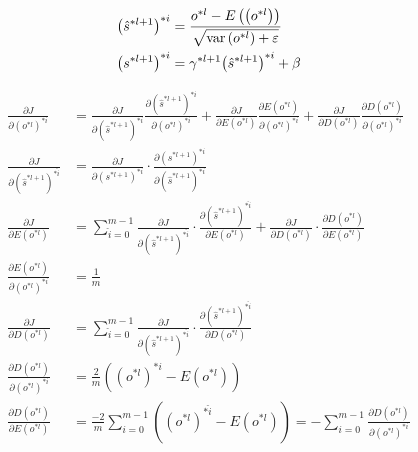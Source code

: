 \documentclass[runningheads,openany]{xhlPaper}
\begin{document}
\begin{equation}
\begin{aligned}
{\left( {{{\hat s}^{*l + 1}}} \right)^{*i}} &= \frac{{{o^{*l}} - E\left( {\left( {{o^{*l}}} \right)} \right)}}{{\sqrt {{\mathop{\rm var}} \left( {{o^{*l}}} \right) + \varepsilon } }}\\
{\left( {{s^{*l + 1}}} \right)^{*i}} &= {\gamma ^{*l + 1}}{\left( {{{\hat s}^{*l + 1}}} \right)^{*i}} + \beta 
\end{aligned}
\end{equation}

\begin{equation}
\begin{aligned}
\frac{{\partial J}}{{\partial {{\left( {{o^{*l}}} \right)}^{*i}}}} &= \frac{{\partial J}}{{\partial {{\left( {{{\hat s}^{*l + 1}}} \right)}^{*i}}}}\frac{{\partial {{\left( {{{\hat s}^{*l + 1}}} \right)}^{*i}}}}{{\partial {{\left( {{o^{*l}}} \right)}^{*i}}}} + \frac{{\partial J}}{{\partial E\left( {{o^{*l}}} \right)}}\frac{{\partial E\left( {{o^{*l}}} \right)}}{{\partial {{\left( {{o^{*l}}} \right)}^{*i}}}} + \frac{{\partial J}}{{\partial D\left( {{o^{*l}}} \right)}}\frac{{\partial D\left( {{o^{*l}}} \right)}}{{\partial {{\left( {{o^{*l}}} \right)}^{*i}}}}\\
\frac{{\partial J}}{{\partial {{\left( {{{\hat s}^{*l + 1}}} \right)}^{*\hat i}}}} &= \frac{{\partial J}}{{\partial {{\left( {{s^{*l + 1}}} \right)}^{*i}}}} \cdot \frac{{\partial {{\left( {{s^{*l + 1}}} \right)}^{*i}}}}{{\partial {{\left( {{{\hat s}^{*l + 1}}} \right)}^{*i}}}}\\
\frac{{\partial J}}{{\partial E\left( {{o^{*l}}} \right)}} &= \sum\limits_{\hat i = 0}^{m - 1} {\frac{{\partial J}}{{\partial {{\left( {{{\hat s}^{*l + 1}}} \right)}^{*\hat i}}}} \cdot \frac{{\partial {{\left( {{{\hat s}^{*l + 1}}} \right)}^{*\hat i}}}}{{\partial E\left( {{o^{*l}}} \right)}}}  + \frac{{\partial J}}{{\partial D\left( {{o^{*l}}} \right)}} \cdot \frac{{\partial D\left( {{o^{*l}}} \right)}}{{\partial E\left( {{o^{*l}}} \right)}}\\
\frac{{\partial E\left( {{o^{*l}}} \right)}}{{\partial {{\left( {{o^{*l}}} \right)}^{*i}}}} &= \frac{1}{m}\\
\frac{{\partial J}}{{\partial D\left( {{o^{*l}}} \right)}} &= \sum\limits_{\hat i = 0}^{m - 1} {\frac{{\partial J}}{{\partial {{\left( {{{\hat s}^{*l + 1}}} \right)}^{*\hat i}}}} \cdot \frac{{\partial {{\left( {{{\hat s}^{*l + 1}}} \right)}^{*\hat i}}}}{{\partial D\left( {{o^{*l}}} \right)}}} \\
\frac{{\partial D\left( {{o^{*l}}} \right)}}{{\partial {{\left( {{o^{*l}}} \right)}^{*i}}}} &= \frac{2}{m}\left( {{{\left( {{o^{*l}}} \right)}^{*i}} - E\left( {{o^{*l}}} \right)} \right)\\
\frac{{\partial D\left( {{o^{*l}}} \right)}}{{\partial E\left( {{o^{*l}}} \right)}} &= \frac{{ - 2}}{m}\sum\limits_{i = 0}^{m - 1} {\left( {{{\left( {{o^{*l}}} \right)}^{*\hat i}} - E\left( {{o^{*l}}} \right)} \right)}  =  - \sum\limits_{i = 0}^{m - 1} {\frac{{\partial D\left( {{o^{*l}}} \right)}}{{\partial {{\left( {{o^{*l}}} \right)}^{*i}}}}} 
\end{aligned}
\end{equation}
\end{document}
